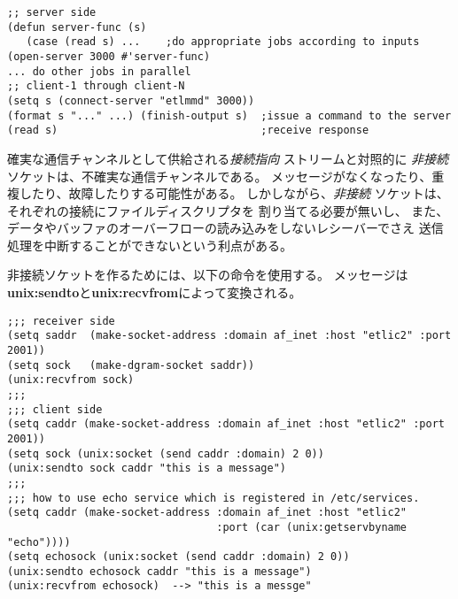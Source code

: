 \begin{verbatim}
;; server side
(defun server-func (s) 
   (case (read s) ...    ;do appropriate jobs according to inputs
(open-server 3000 #'server-func)
... do other jobs in parallel
;; client-1 through client-N
(setq s (connect-server "etlmmd" 3000))
(format s "..." ...) (finish-output s)	;issue a command to the server
(read s)                                ;receive response
\end{verbatim}

確実な通信チャンネルとして供給される{\it 接続指向} ストリームと対照的に
{\it 非接続} ソケットは、不確実な通信チャンネルである。
メッセージがなくなったり、重複したり、故障したりする可能性がある。
しかしながら、{\it 非接続} ソケットは、それぞれの接続にファイルディスクリプタを
割り当てる必要が無いし、
また、データやバッファのオーバーフローの読み込みをしないレシーバーでさえ
送信処理を中断することができないという利点がある。

非接続ソケットを作るためには、以下の命令を使用する。
メッセージは{\bf unix:sendto}と{\bf unix:recvfrom}によって変換される。
\begin{verbatim}
;;; receiver side
(setq saddr  (make-socket-address :domain af_inet :host "etlic2" :port 2001))
(setq sock   (make-dgram-socket saddr))
(unix:recvfrom sock)
;;;
;;; client side
(setq caddr (make-socket-address :domain af_inet :host "etlic2" :port 2001))
(setq sock (unix:socket (send caddr :domain) 2 0))
(unix:sendto sock caddr "this is a message")
;;;
;;; how to use echo service which is registered in /etc/services.
(setq caddr (make-socket-address :domain af_inet :host "etlic2"
                                 :port (car (unix:getservbyname "echo"))))
(setq echosock (unix:socket (send caddr :domain) 2 0))
(unix:sendto echosock caddr "this is a message")
(unix:recvfrom echosock)  --> "this is a messge"
\end{verbatim}


